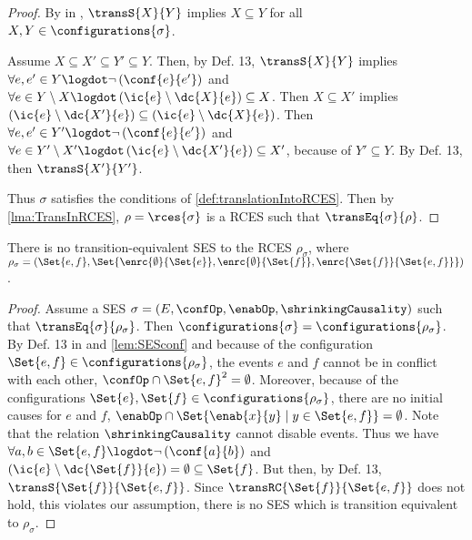 \documentclass[runningheads,a4paper]{llncs}
\begin{document}
\begin{proof}
	By  in \cite{dynamicCausality15}, $ \transS{X}{Y} $ implies $ X \subseteq Y $  for all $ X, Y \in \configurations{\sigma} $.
	
	Assume $ X \subseteq X' \subseteq Y' \subseteq Y $.
	Then, by Def. 13, $ \transS{X}{Y} $ implies $ \forall e, e' \in Y \logdot \neg \left( \conf{e}{e'} \right) $ and $ \forall e \in Y \setminus X \logdot \left( \ic{e} \setminus \dc{X}{e} \right) \subseteq X $.
	Then $ X \subseteq X' $ implies $ \left( \ic{e} \setminus \dc{X'}{e} \right)
	\subseteq \left( \ic{e} \setminus \dc{X}{e} \right) $. Then $ \forall e, e' \in Y' \logdot \neg \left( \conf{e}{e'} \right) $ and $ \forall e \in Y' \setminus X' \logdot \left( \ic{e} \setminus \dc{X'}{e} \right) \subseteq X' $, because of $ Y' \subseteq Y $.
	By Def. 13, then $ \transS{X'}{Y'} $.
	
	Thus $ \sigma $ satisfies the conditions of
	\ref{def:translationIntoRCES}. Then by \lem\ref{lma:TransInRCES},
	$ \rho = \rces{\sigma} $ is a RCES such that $\transEq{\sigma}{\rho}$.
\end{proof}

\begin{lemma}
\label{lma:SESinRCESstrictly} 
	There is no transition-equivalent SES to the RCES $ \rho_{\sigma} $, where $ \rho_{\sigma} = ( \Set{ e , f }, \Set{ \enrc{\emptyset}{\Set{ e }} , \enrc{\emptyset}{\Set{ f }} , \enrc{\Set{ f }}{\Set{ e, f }} } ) $.
\end{lemma}

\begin{proof}
	Assume a SES $ \sigma = \left( E, \confOp, \enabOp, \shrinkingCausality \right) $ such that $ \transEq{\sigma }{\rho_{\sigma}} $. Then $ \configurations{\sigma} = \configurations{\rho_{\sigma}} $.
	By Def. 13 in \cite{dynamicCausality15} and \lem\ref{lem:SESconf} and because of
	the configuration $ \Set{ e, f } \in \configurations{\rho_{\sigma}} $, the
	events $ e $ and $ f $ cannot be in conflict with each other, \ie $ \confOp
	\cap \Set{ e, f }^2 = \emptyset $.
	Moreover, because of the configurations $ \Set{ e }, \Set{ f } \in \configurations{\rho_{\sigma}} $, there are no initial causes for $ e $ and $ f $, \ie $ \enabOp \cap \Set{ \enab{x}{y} \mid y \in \Set{ e, f } } = \emptyset $.
	Note that the relation $ \shrinkingCausality $ cannot disable events.
	Thus we have $ \forall a, b \in \Set{ e, f } \logdot \neg \left( \conf{a}{b} \right) $ and $ \left( \ic{e} \setminus \dc{\Set{ f }}{e} \right) = \emptyset \subseteq \Set{ f } $.
	But then, by Def. 13, $ \transS{\Set{ f }}{\Set{ e, f }} $.
	Since $ \transRC{\Set{ f }}{\Set{ e, f }} $ does not hold, this violates our
	assumption, \ie there is no SES which is transition equivalent to $
	\rho_{\sigma} $.
\end{proof}
\end{document}
